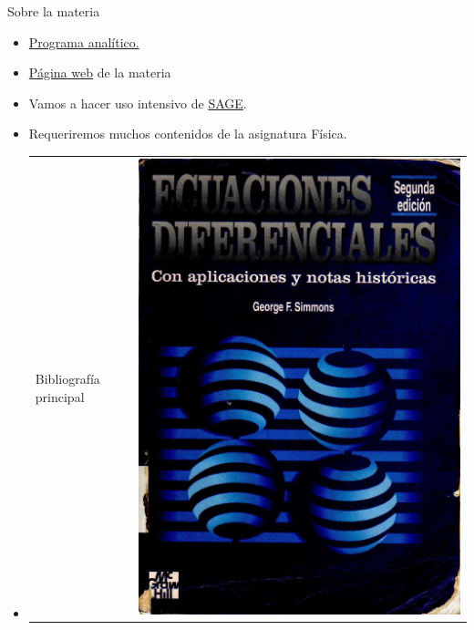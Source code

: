\documentclass[handout,hyperref={colorlinks=true}]{beamer}
\begin{document}
\begin{frame}{Sobre la materia}

\begin{itemize}
 \item  \href{https://docs.google.com/viewer?a=v&pid=sites&srcid=ZGVmYXVsdGRvbWFpbnxlY3VhY2lvbmVzZGlmZXJlbmNpYWxldW5yY3xneDoyZjE0YzJmMDcyODc0ZGQ3}{Programa analítico.}
 \item  \href{https://sites.google.com/site/ecuacionesdiferencialeunrc/ecuaciones-diferenciales-unrc}{Página web} de la materia
 \item  Vamos a hacer uso intensivo de \href{http://www.sagemath.org/}{SAGE}.
 \item  Requeriremos muchos contenidos de la asignatura Física.
 \item  \begin{tabular}{m{4cm} m{2cm}} Bibliografía principal & \includegraphics[scale=0.05]{imagenes/Tapa_Simmons.jpg}           \end{tabular} 

\end{itemize}

\end{frame}
\end{document}
